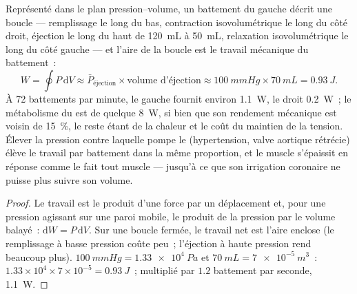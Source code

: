 \begin{theorem}\label{thm:b2:heart:work}
Représenté dans le plan pression--volume, un battement du 
gauche décrit une boucle --- remplissage le long du bas, contraction
isovolumétrique le long du côté droit, éjection le long du haut de
\qty{120}{mL} à \qty{50}{mL}, relaxation isovolumétrique le long du côté
gauche --- et l'aire de la boucle est le travail mécanique du
battement~:
\[
W = \oint P\,\mathrm{d}V \approx \bar P_{\text{éjection}}\times \text{volume d'éjection} \approx \qty{100}{mmHg}\times\qty{70}{mL} = \qty{0.93}{J}.
\]
À 72 battements par minute, le  gauche fournit environ
\qty{1.1}{W}, le droit \qty{0.2}{W}~; le métabolisme du  est de
quelque \qty{8}{W}, si bien que son rendement mécanique est voisin de
\qty{15}{\%}, le reste étant de la chaleur et le coût du maintien de la
tension. Élever la pression contre laquelle pompe le  (hypertension,
valve aortique rétrécie) élève le travail par battement dans la même
proportion, et le muscle s'épaissit en réponse comme le fait tout muscle
--- jusqu'à ce que son irrigation coronaire ne puisse plus suivre son
volume.
\end{theorem}
\begin{proof}
Le travail est le produit d'une force par un déplacement et, pour une
pression agissant sur une paroi mobile, le produit de la pression par le
volume balayé~: $\mathrm{d}W = P\,\mathrm{d}V$. Sur une boucle fermée, le
travail net est l'aire enclose (le remplissage à basse pression coûte peu~;
l'éjection à haute pression rend beaucoup plus).
$\qty{100}{mmHg} = \qty{1.33e4}{Pa}$ et $\qty{70}{mL} =
\qty{7e-5}{m^3}$~: $1.33\times 10^{4}\times 7\times 10^{-5} =
\qty{0.93}{J}$~; multiplié par $1.2$ battement par seconde, \qty{1.1}{W}.
\end{proof}


